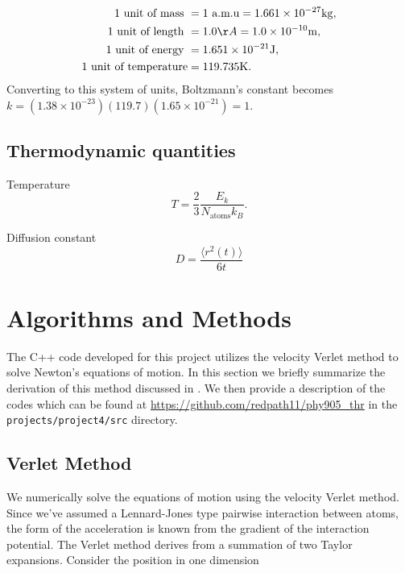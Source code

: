 \documentclass[10pt,showpacs,preprintnumbers,footinbib,amsmath,amssymb,aps,prl,twocolumn,groupedaddress,superscriptaddress,showkeys]{revtex4-1}
\newcommand{\pwrten}[1]{%
	\ensuremath{10^{#1}} }
\begin{document}
\begin{align*}
	\text{1 unit of mass } &= 1 \text{ a.m.u} = 1.661\times 10^{-27}\mathrm{kg},\\
	\text{1 unit of length } &= 1.0 {\AA} = 1.0\times 10^{-10}\mathrm{m},\\
	\text{1 unit of energy } &= 1.651\times 10^{-21}\mathrm{J},\\
	\text{1 unit of temperature} &= 119.735\mathrm{K}.
\end{align*}
Converting to this system of units, Boltzmann's constant becomes
$k = (1.38 \times \pwrten{-23} )(119.7)(1.65 \times \pwrten{-21}) = 1$.

\subsection*{Thermodynamic quantities}

Temperature
\begin{equation}
	T = \frac{2}{3}\frac{E_k}{N_\text{atoms} k_B}.
	\label{eq:temperature}
\end{equation}

Diffusion constant
\begin{equation}
	D = \frac{\langle r^2(t) \rangle }{6t}
	\label{eq:diffusion}
\end{equation}


\section*{Algorithms and Methods}

The C++ code developed for this project utilizes the velocity
Verlet method to solve Newton's equations of motion. In this section we briefly
summarize the derivation of this method discussed in \citet{Morten}. We
then provide a description of the codes which can be
found at \url{https://github.com/redpath11/phy905_thr} in the
\texttt{projects/project4/src} directory.

\subsection*{Verlet Method}

We numerically solve the equations of motion using the velocity
Verlet method. Since we've assumed a Lennard-Jones type
pairwise interaction between atoms, the form of the acceleration
is known from the gradient of the interaction potential. The Verlet
method derives from a summation of two Taylor expansions. Consider
the position in one dimension
\end{document}
